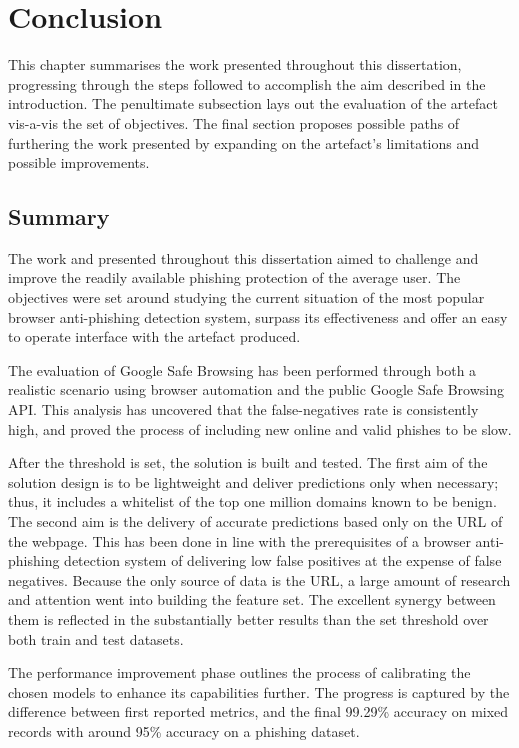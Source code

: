 \chapter{Conclusion}This chapter summarises the work presented throughout this dissertation, progressing through the steps followed to accomplish the aim described in the introduction. The penultimate subsection lays out the evaluation of the artefact vis-a-vis the set of objectives. The final section proposes possible paths of furthering the work presented by expanding on the artefact's limitations and possible improvements.

\section{Summary}
The work and presented throughout this dissertation aimed to challenge and improve the readily available phishing protection of the average user. The objectives were set around studying the current situation of the most popular browser anti-phishing detection system, surpass its effectiveness and offer an easy to operate interface with the artefact produced.

The evaluation of Google Safe Browsing has been performed through both a realistic scenario using browser automation and the public Google Safe Browsing API. This analysis has uncovered that the false-negatives rate is consistently high, and proved the process of including new online and valid phishes to be slow.

After the threshold is set, the solution is built and tested. The first aim of the solution design is to be lightweight and deliver predictions only when necessary; thus, it includes a whitelist of the top one million domains known to be benign. The second aim is the delivery of accurate predictions based only on the URL of the webpage. This has been done in line with the prerequisites of a browser anti-phishing detection system of delivering low false positives at the expense of false negatives.
Because the only source of data is the URL, a large amount of research and attention went into building the feature set. The excellent synergy between them is reflected in the substantially better results than the set threshold over both train and test datasets.

The performance improvement phase outlines the process of calibrating the chosen models to enhance its capabilities further. The progress is captured by the difference between first reported metrics, and the final 99.29\% accuracy on mixed records with around 95\% accuracy on a phishing dataset.

